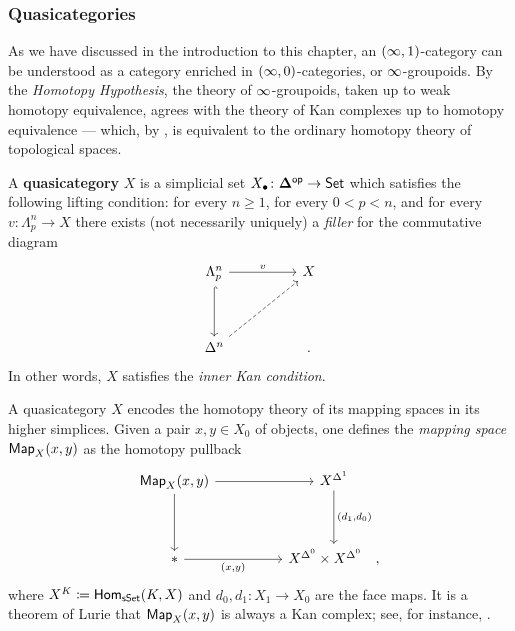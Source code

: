 \subsubsection{Quasicategories}

As we have discussed in the introduction to this chapter, an
$(\operatorname{\infty},1)$-category can be understood as a category enriched in
$(\operatorname{\infty},0)$-categories, or $\operatorname{\infty}$-groupoids.  By the \emph{Homotopy Hypothesis},
the theory of $\operatorname{\infty}$-groupoids, taken up to weak homotopy equivalence, agrees
with the theory of Kan complexes up to homotopy equivalence --- which, by
, is equivalent to the ordinary homotopy theory
of topological spaces.

\begin{definition}\label{ch2:: def: quasicategory}
  A \textbf{quasicategory} $X$ is a simplicial set
  $X_{\bullet} \colon \mathbf\Delta^{\mathsf{op}} \to \operatorname{{\mathsf{Set}}}$ which satisfies the following
  lifting condition: for every $n \geq 1$, for every $0 < p < n$, and for
  every $v \colon \Lambda^{n}_{p} \to X$ there exists (not necessarily
  uniquely) a \emph{filler} for the commutative diagram
  \[
  \begin{tikzcd}[ampersand replacement=\&]
  	{\Lambda^{n}_{p}} \&\& X \\
  	\\
  	{\Delta^{n}} \&\& {.}
  	\arrow["v", from=1-1, to=1-3]
  	\arrow[hook, from=1-1, to=3-1]
  	\arrow[dashed, from=3-1, to=1-3]
  \end{tikzcd}
  \]
  In other words, $X$ satisfies the \emph{inner Kan condition}.
\end{definition}

\begin{observation}
  A quasicategory $X$ encodes the homotopy theory of its mapping spaces in its
  higher simplices.  Given a pair $x,y \in X_0$ of objects, one defines the
  \emph{mapping space} $\operatorname{{\sf Map}}_{X}(x,y)$ as the homotopy pullback
  \[
  \begin{tikzcd}[ampersand replacement=\&]
    {\Map_{X}(x,y)} \&\& {X^{\Delta^1}} \\
    \\
    {*} \&\& {X^{\Delta^0}\times X^{\Delta^0} \quad ,}
    \arrow[from=1-1, to=1-3]
    \arrow[from=1-1, to=3-1]
    \arrow["{(d_1,d_0)}", from=1-3, to=3-3]
    \arrow["{(x,y)}"', from=3-1, to=3-3]
  \end{tikzcd}
  \]
  where $X^{K} \coloneqq \operatorname{\sf Hom}_{\operatorname{\sf sSet}}(K,X)$ and $d_0,d_1\colon X_1\to X_0$
  are the face maps.  It is a theorem of Lurie that $\operatorname{{\sf Map}}_X(x,y)$ is always a
  Kan complex; see, for instance, \cite[§2.2.5]{HTT}.
\end{observation}

